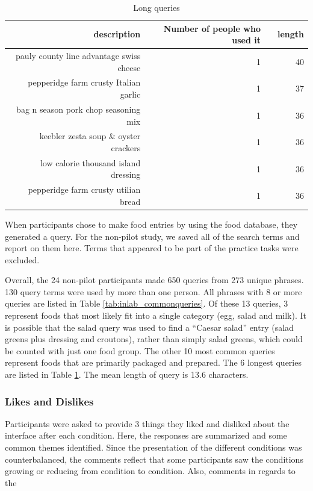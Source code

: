 \begin{table}[htbp]
\small
  \centering
    \begin{tabular}{rrrr}
    \toprule
    description & Number of people who used it &       & length  \\
    \midrule
    pauly county line advantage swiss cheese & 1     &       & 40 \\
    pepperidge farm crusty Italian garlic & 1     &       & 37 \\
    bag n season pork chop seasoning mix & 1     &       & 36 \\
    keebler zesta soup \& oyster crackers & 1     &       & 36 \\
    low calorie thousand island dressing & 1     &       & 36 \\
    pepperidge farm crusty utilian bread & 1     &       & 36 \\
    \bottomrule
    \end{tabular}%
  \caption{Long queries}
  \label{tab:inlabLongQueries}%
\end{table}%


When participants chose to make food entries by using the food database, they generated a query. For the non-pilot study, we saved all of the search terms and report on them here. Terms that appeared to be part of the practice tasks were excluded. 

Overall, the 24 non-pilot participants made 650 queries from 273 unique phrases. 130 query terms were used by more than one person. All phrases with 8 or more queries are listed in Table \ref{tab:inlab_commonqueries}. Of these 13 queries, 3 represent foods that most likely fit into a single category (egg, salad and milk). It is possible that the salad query was used to find a ``Caesar salad'' entry (salad greens plus dressing and croutons), rather than simply salad greens, which could be counted with just one food group. The other 10 most common queries represent foods that are primarily packaged and prepared. The 6 longest queries are listed in Table \ref{tab:inlabLongQueries}. The mean length of query is 13.6 characters. 

\subsubsection{Likes and Dislikes}
Participants were asked to provide 3 things they liked and disliked about the interface after each condition. Here, the responses are summarized and some common themes identified. Since the presentation of the different conditions was counterbalanced, the comments reflect that some participants saw the conditions growing or reducing from condition to condition. Also, comments in regards to the 

